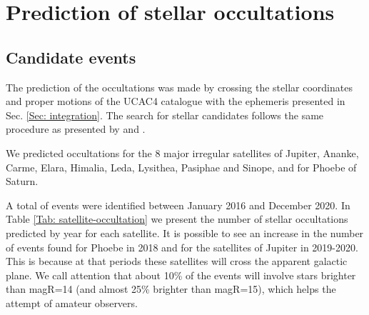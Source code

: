 \documentclass[useAMS,usenatbib]{mn2e}
\begin{document}
%
%

\section{Prediction of stellar occultations} \label{Sec: predictions}

\subsection{Candidate events}

The prediction of the occultations was made by crossing the stellar coordinates and proper motions of the UCAC4 catalogue \citep{Zacharias2013} with the ephemeris presented in Sec. \ref{Sec: integration}. The search for stellar candidates follows the same procedure as presented by \cite{Assafin2010, Assafin2012} and \cite{Camargo2014}.

We predicted occultations for the 8 major irregular satellites of Jupiter,  Ananke, Carme, Elara, Himalia, Leda, Lysithea, Pasiphae and Sinope, and for Phoebe of Saturn.

A total of \noccs events were identified between January 2016 and December 2020. In Table \ref{Tab: satellite-occultation} we present the number of stellar occultations predicted by year for each satellite. It is possible to see an increase in the number of events found for Phoebe in 2018 and for the satellites of Jupiter in 2019-2020. This is because at that periods these satellites will cross the apparent galactic plane. We call attention that about 10\% of the events will involve stars brighter than magR=14 (and almost 25\% brighter than magR=15), which helps the attempt of amateur observers.
\end{document}
